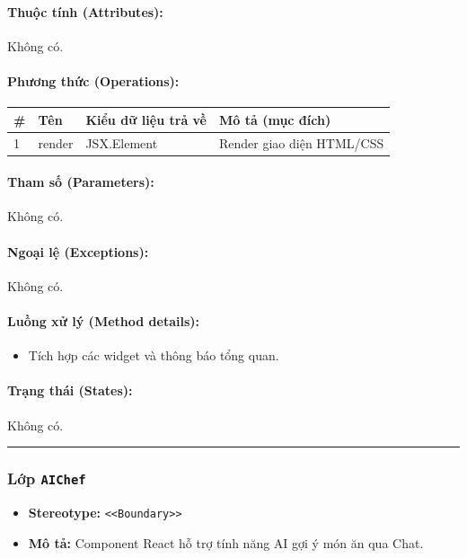 \documentclass[12pt,a4paper]{article}
\begin{document}
\paragraph{Thuộc tính (Attributes):}
Không có.

\paragraph{Phương thức (Operations):}
\begin{longtable}{|p{0.6cm}|p{5.0cm}|p{2.8cm}|p{5.4cm}|}
\hline
\textbf{\#} & \textbf{Tên} & \textbf{Kiểu dữ liệu trả về} & \textbf{Mô tả (mục đích)} \\ \hline
\endhead
1 & render & JSX.Element & Render giao diện HTML/CSS \\ \hline
\end{longtable}

\paragraph{Tham số (Parameters):}
Không có.

\paragraph{Ngoại lệ (Exceptions):}
Không có.

\paragraph{Luồng xử lý (Method details):}
\begin{itemize}[leftmargin=*]
    \item Tích hợp các widget và thông báo tổng quan.
\end{itemize}


\paragraph{Trạng thái (States):}
Không có.

\vskip 0.5cm
\noindent\rule{\textwidth}{0.5pt}
\vskip 0.5cm

\subsubsection{Lớp \texttt{AIChef}}

\begin{itemize}[leftmargin=*]
    \item \textbf{Stereotype:} \texttt{\textless{}\textless{}Boundary\textgreater{}\textgreater{}}
    \item \textbf{Mô tả:} Component React hỗ trợ tính năng AI gợi ý món ăn qua Chat.
\end{itemize}
\end{document}
